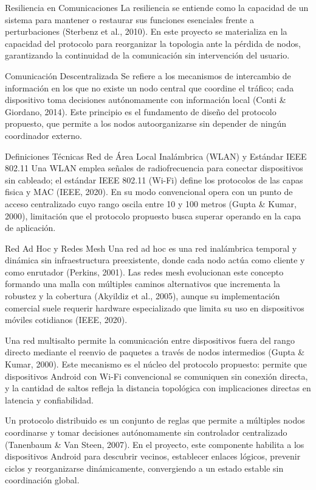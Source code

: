 Resiliencia en Comunicaciones La resiliencia se entiende como la capacidad de un sistema para mantener o restaurar sus funciones esenciales frente a perturbaciones (Sterbenz et al., 2010). En este proyecto se materializa en la capacidad del protocolo para reorganizar la topologia ante la pérdida de nodos, garantizando la continuidad de la comunicación sin intervención del usuario.

Comunicación Descentralizada Se refiere a los mecanismos de intercambio de información en los que no existe un nodo central que coordine el tráfico; cada dispositivo toma decisiones autónomamente con información local (Conti \& Giordano, 2014). Este principio es el fundamento de diseño del protocolo propuesto, que permite a los nodos autoorganizarse sin depender de ningún coordinador externo.

Definiciones Técnicas Red de Área Local Inalámbrica (WLAN) y Estándar IEEE 802.11 Una WLAN emplea señales de radiofrecuencia para conectar dispositivos sin cableado; el estándar IEEE 802.11 (Wi-Fi) define los protocolos de las capas fisica y MAC (IEEE, 2020). En su modo convencional opera con un punto de acceso centralizado cuyo rango oscila entre 10 y 100 metros (Gupta \& Kumar, 2000), limitación que el protocolo propuesto busca superar operando en la capa de aplicación.

Red Ad Hoc y Redes Mesh Una red ad hoc es una red inalámbrica temporal y dinámica sin infraestructura preexistente, donde cada nodo actúa como cliente y como enrutador (Perkins, 2001). Las redes mesh evolucionan este concepto formando una malla con múltiples caminos alternativos que incrementa la robustez y la cobertura (Akyildiz et al., 2005), aunque su implementación comercial suele requerir hardware especializado que limita su uso en dispositivos móviles cotidianos (IEEE, 2020).

Una red multisalto permite la comunicación entre dispositivos fuera del rango directo mediante el reenvio de paquetes a través de nodos intermedios (Gupta \& Kumar, 2000). Este mecanismo es el núcleo del protocolo propuesto: permite que dispositivos Android con Wi-Fi convencional se comuniquen sin conexión directa, y la cantidad de saltos refleja la distancia topológica con implicaciones directas en latencia y confiabilidad.

Un protocolo distribuido es un conjunto de reglas que permite a múltiples nodos coordinarse y tomar decisiones autónomamente sin controlador centralizado (Tanenbaum \& Van Steen, 2007). En el proyecto, este componente habilita a los dispositivos Android para descubrir vecinos, establecer enlaces lógicos, prevenir ciclos y reorganizarse dinámicamente, convergiendo a un estado estable sin coordinación global.

